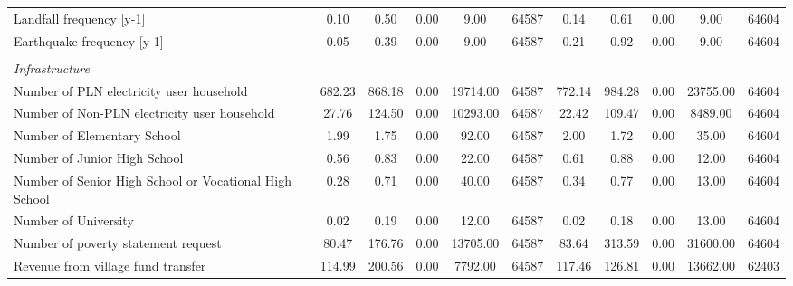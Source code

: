 \begin{tabular}{l*{2}{ccccc}}
Landfall frequency [y-1]&     0.10&     0.50&     0.00&     9.00&    64587&     0.14&     0.61&     0.00&     9.00&    64604\\
Earthquake frequency [y-1]&     0.05&     0.39&     0.00&     9.00&    64587&     0.21&     0.92&     0.00&     9.00&    64604\\
\vspace{0.1em} \\ \emph{Infrastructure}&         &         &         &         &         &         &         &         &         &         \\
Number of PLN electricity user household&   682.23&   868.18&     0.00& 19714.00&    64587&   772.14&   984.28&     0.00& 23755.00&    64604\\
Number of Non-PLN electricity user household&    27.76&   124.50&     0.00& 10293.00&    64587&    22.42&   109.47&     0.00&  8489.00&    64604\\
Number of Elementary School&     1.99&     1.75&     0.00&    92.00&    64587&     2.00&     1.72&     0.00&    35.00&    64604\\
Number of Junior High School&     0.56&     0.83&     0.00&    22.00&    64587&     0.61&     0.88&     0.00&    12.00&    64604\\
Number of Senior High School or Vocational High School&     0.28&     0.71&     0.00&    40.00&    64587&     0.34&     0.77&     0.00&    13.00&    64604\\
Number of University&     0.02&     0.19&     0.00&    12.00&    64587&     0.02&     0.18&     0.00&    13.00&    64604\\
Number of poverty statement request&    80.47&   176.76&     0.00& 13705.00&    64587&    83.64&   313.59&     0.00& 31600.00&    64604\\
Revenue from village fund transfer&   114.99&   200.56&     0.00&  7792.00&    64587&   117.46&   126.81&     0.00& 13662.00&    62403\\
\bottomrule
\end{tabular}
